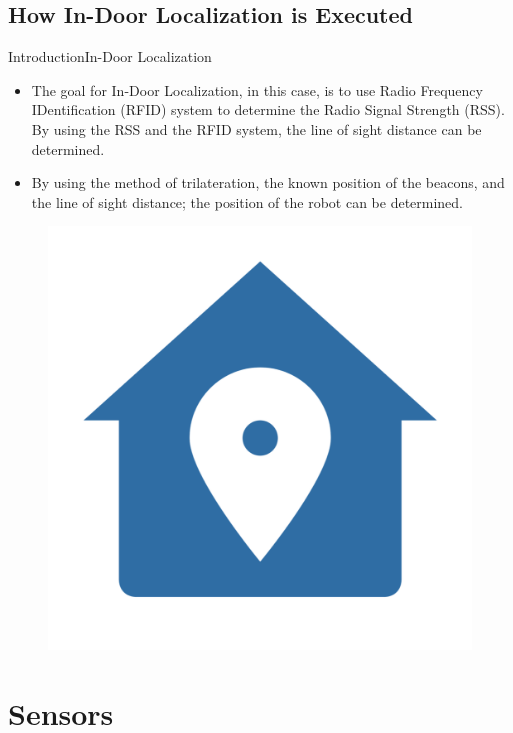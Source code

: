 \documentclass{beamer}
\begin{document}
\subsection{How In-Door Localization is Executed}
\begin{frame}{Introduction}{In-Door Localization}
\begin{itemize}
\item
 The goal for In-Door Localization, in this case, is to use Radio Frequency IDentification (RFID) system to determine the Radio Signal Strength (RSS). By using the RSS and the RFID system, the line of sight distance can be determined. 
 \item
 By using the method of trilateration, the known position of the beacons, and the line of sight distance; the position of the robot can be determined.
\end{itemize}
\begin{figure}
\centering
\includegraphics[scale=0.2]{figs/img/Lu_Images/indoorIcon}
\end{figure}
\end{frame}


\section{Sensors}
\end{document}
